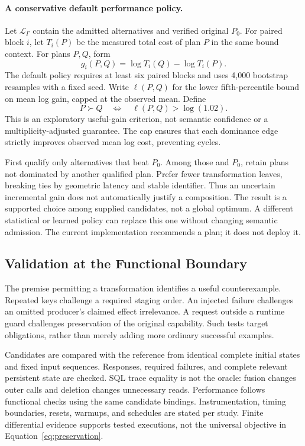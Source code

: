 \documentclass[acmsmall,screen,review,anonymous]{acmart}
\begin{document}
\paragraph{A conservative default performance policy.}
Let $\mathcal{L}_\Gamma$ contain the admitted alternatives and verified original
$P_0$. For paired block $i$, let $T_i(P)$ be the measured total cost of plan $P$
in the same bound context. For plans $P,Q$, form
\begin{equation}
 g_i(P,Q)=\log T_i(Q)-\log T_i(P).
\end{equation}
The default policy requires at least six paired blocks and uses 4,000 bootstrap
resamples with a fixed seed. Write $\ell(P,Q)$ for the lower fifth-percentile
bound on mean log gain, capped at the observed mean. Define
\begin{equation}
 P\succ Q\quad\Longleftrightarrow\quad\ell(P,Q)>\log(1.02).
 \label{eq:ranking}
\end{equation}
This is an exploratory useful-gain criterion, not semantic confidence or a
multiplicity-adjusted guarantee. The cap ensures that each dominance edge
strictly improves observed mean log cost, preventing cycles.

First qualify only alternatives that beat $P_0$. Among those and $P_0$, retain
plans not dominated by another qualified plan. Prefer fewer transformation
leaves, breaking ties by geometric latency and stable identifier. Thus an
uncertain incremental gain does not automatically justify a composition.
The result is a supported choice among supplied candidates, not a global
optimum. A different statistical or learned policy can replace this one
without changing semantic admission. The current implementation recommends
a plan; it does not deploy it.

\subsection{Validation at the Functional Boundary}
\label{sec:validation}
The premise permitting a transformation identifies a useful counterexample.
Repeated keys challenge a required staging order. An injected failure challenges
an omitted producer's claimed effect irrelevance. A request outside a runtime
guard challenges preservation of the original capability. Such tests target
obligations, rather than merely adding more ordinary successful examples.

Candidates are compared with the reference from identical complete initial
states and fixed input sequences. Responses, required failures, and complete
relevant persistent state are checked. SQL trace equality is not the oracle:
fusion changes outer calls and deletion changes unnecessary reads. Performance
follows functional checks using the same candidate bindings. Instrumentation,
timing boundaries, resets, warmups, and schedules are stated per study. Finite
differential evidence supports tested executions, not the universal objective
in Equation~\ref{eq:preservation}.
\end{document}
